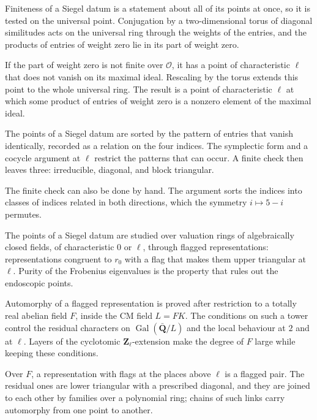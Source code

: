 Finiteness of a Siegel datum is a statement about all of its points at once, so it is tested on the universal point. Conjugation by a two-dimensional torus of diagonal similitudes acts on the universal ring through the weights of the entries, and the products of entries of weight zero lie in its part of weight zero.

If the part of weight zero is not finite over $\mathcal O$, it has a point of characteristic $\ell$ that does not vanish on its maximal ideal. Rescaling by the torus extends this point to the whole universal ring. The result is a point of characteristic $\ell$ at which some product of entries of weight zero is a nonzero element of the maximal ideal.

The points of a Siegel datum are sorted by the pattern of entries that vanish identically, recorded as a relation on the four indices. The symplectic form and a cocycle argument at $\ell$ restrict the patterns that can occur. A finite check then leaves three: irreducible, diagonal, and block triangular.

The finite check can also be done by hand. The argument sorts the indices into classes of indices related in both directions, which the symmetry $i\mapsto5-i$ permutes.

The points of a Siegel datum are studied over valuation rings of algebraically closed fields, of characteristic $0$ or $\ell$, through flagged representations: representations congruent to $r_0$ with a flag that makes them upper triangular at $\ell$. Purity of the Frobenius eigenvalues is the property that rules out the endoscopic points.

Automorphy of a flagged representation is proved after restriction to a totally real abelian field $F$, inside the CM field $L=FK$. The conditions on such a tower control the residual characters on $\operatorname{Gal}(\bar{\mathbf Q}/L)$ and the local behaviour at $2$ and at $\ell$. Layers of the cyclotomic $\mathbf Z_\ell$-extension make the degree of $F$ large while keeping these conditions.

Over $F$, a representation with flags at the places above $\ell$ is a flagged pair. The residual ones are lower triangular with a prescribed diagonal, and they are joined to each other by families over a polynomial ring; chains of such links carry automorphy from one point to another.

